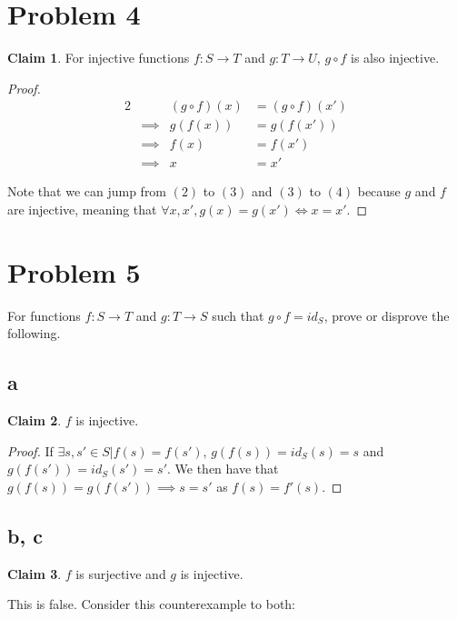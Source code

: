 \documentclass[12pt,letterpaper]{article}
\theoremstyle{definition}
\newtheorem*{claim}{Claim}
\begin{document}
\section*{Problem 4}
\begin{claim}
    For injective functions $f :S \rightarrow T$ and $g: T \rightarrow U$, $g \circ f$ is also injective.
\end{claim}

\begin{proof}
    \begin{alignat}{2}
        && (g \circ f)(x) &= (g \circ f)(x') \\
        &\implies & g(f(x)) &= g(f(x')) \\
        &\implies & f(x) &= f(x') \\
        &\implies & x &= x'
    \end{alignat}
    
    Note that we can jump from $(2)$ to $(3)$ and $(3)$ to $(4)$ because $g$ and $f$ are injective, meaning that $\forall x, x', g(x) = g(x') \iff x = x'$.
\end{proof}

\section*{Problem 5}
For functions $f: S \rightarrow T$ and $g: T \rightarrow S$ such that $g \circ f = id_S$, prove or disprove the following.
\subsection*{a}
\begin{claim}
    $f$ is injective. 
\end{claim}

\begin{proof}
    If $\exists s, s' \in S | f(s) = f(s')$, $g(f(s)) = id_S(s) = s$ and $g(f(s')) = id_S(s') = s'$. 
    We then have that $g(f(s)) = g(f(s')) \implies s = s'$ as $f(s) = f'(s)$. 
\end{proof}

\subsection*{b, c}
\begin{claim}
    $f$ is surjective and $g$ is injective. 
\end{claim}

This is false. Consider this counterexample to both:
\end{document}
